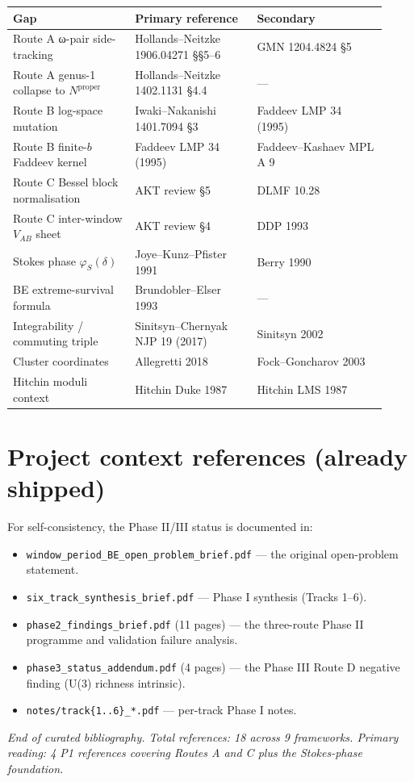 \documentclass[11pt]{article}
\begin{document}
\begin{center}\small
\begin{tabular}{p{0.30\linewidth} p{0.30\linewidth} p{0.32\linewidth}}
\toprule
Gap & Primary reference & Secondary \\
\midrule
Route A ω-pair side-tracking & Hollands--Neitzke 1906.04271 \S\S5--6 & GMN 1204.4824 \S5 \\
Route A genus-1 collapse to $N^{\mathrm{proper}}$ & Hollands--Neitzke 1402.1131 \S4.4 & --- \\
Route B log-space mutation & Iwaki--Nakanishi 1401.7094 \S3 & Faddeev LMP 34 (1995) \\
Route B finite-$b$ Faddeev kernel & Faddeev LMP 34 (1995) & Faddeev--Kashaev MPL A 9 \\
Route C Bessel block normalisation & AKT review \S5 & DLMF 10.28 \\
Route C inter-window $V_{AB}$ sheet & AKT review \S4 & DDP 1993 \\
Stokes phase $\varphi_S(\delta)$ & Joye--Kunz--Pfister 1991 & Berry 1990 \\
BE extreme-survival formula & Brundobler--Elser 1993 & --- \\
Integrability / commuting triple & Sinitsyn--Chernyak NJP 19 (2017) & Sinitsyn 2002 \\
Cluster coordinates & Allegretti 2018 & Fock--Goncharov 2003 \\
Hitchin moduli context & Hitchin Duke 1987 & Hitchin LMS 1987 \\
\bottomrule
\end{tabular}
\end{center}

\section*{Project context references (already shipped)}

For self-consistency, the Phase II/III status is documented in:

\begin{itemize}
 \item \texttt{window\_period\_BE\_open\_problem\_brief.pdf} ---
 the original open-problem statement.
 \item \texttt{six\_track\_synthesis\_brief.pdf} --- Phase I synthesis
 (Tracks 1--6).
 \item \texttt{phase2\_findings\_brief.pdf} (11 pages) --- the
 three-route Phase II programme and validation failure analysis.
 \item \texttt{phase3\_status\_addendum.pdf} (4 pages) --- the
 Phase III Route D negative finding (U(3) richness intrinsic).
 \item \texttt{notes/track\{1..6\}\_*.pdf} --- per-track Phase I notes.
\end{itemize}

\vspace{0.5em}

\noindent\hfill\textcolor{MutedText}{\emph{End of curated bibliography.
Total references: 18 across 9 frameworks. Primary reading: 4 P1
references covering Routes A and C plus the Stokes-phase foundation.}}\hfill\null
\end{document}
